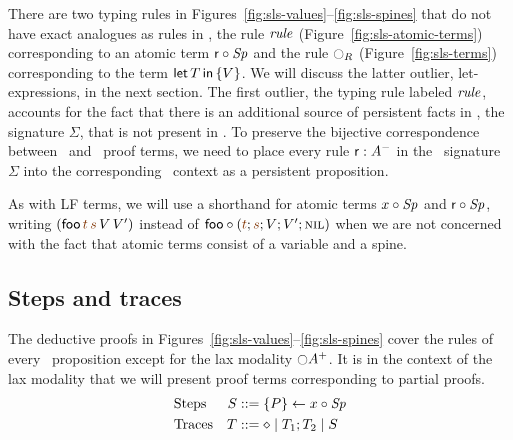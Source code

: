 

There are two typing rules in
Figures~\ref{fig:sls-values}--\ref{fig:sls-spines} that do not have
exact analogues as rules in \ollll, the rule ${\it rule}$
(Figure~\ref{fig:sls-atomic-terms}) corresponding to an atomic term
${\sf r} \circ {{\it Sp}}$ and the rule ${\ocircle}_R$
(Figure~\ref{fig:sls-terms}) corresponding to the term
${\sf let}\,{T}\,{\sf in}\,\{ {V} \}$. We will discuss the latter outlier, let-expressions, in
the next section. The first outlier, the typing rule labeled ${\it
  rule}$, accounts for the fact that there is an additional source of
persistent facts in \sls, the signature $\Sigma$, that is not present
in \ollll.  To preserve the bijective correspondence between
\ollll~and \sls~proof terms, we need to place every rule ${\sf
  r} : A^-$ in the \sls~signature $\Sigma$ into the corresponding
\ollll~context as a persistent proposition.

As with LF terms, we will use a shorthand for atomic terms
${x} \circ {{\it Sp}}$ and ${\sf r} \circ {{\it Sp}}$, writing $({\sf
  foo}\,\lf{t}\,\lf{s}\,V\,V')$ instead of $\tfocusl{\sf
  foo}{(\lf{t};\lf{s};V;V';\tnil)}$ when we are not concerned with the
fact that atomic terms consist of a variable and a spine.

\subsection{Steps and traces}
\label{sec:framework-concurrent}
\label{sec:framework-substprop}

The deductive proofs in
Figures~\ref{fig:sls-values}--\ref{fig:sls-spines} cover the rules of
every \sls~proposition except for the lax modality
${\ocircle}A^+$. It is in the context of the lax modality that we will
present proof terms corresponding to partial proofs.
\begin{align*}
\qquad\qquad\qquad\qquad
&\mbox{Steps}&
S & ::= \{{P}\} \leftarrow {x} \circ {{\it Sp}}
\qquad\qquad\qquad\qquad
\\
&\mbox{Traces}&
T & ::= \diamond \mid T_1; T_2 \mid S
\end{align*}

